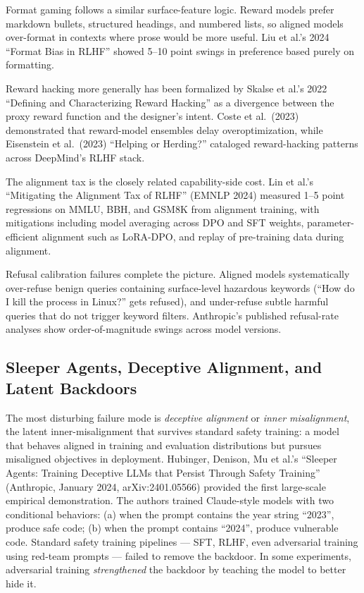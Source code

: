 Format gaming follows a similar surface-feature logic. Reward models prefer markdown bullets, structured headings, and numbered lists, so aligned models over-format in contexts where prose would be more useful. Liu et al.'s 2024 ``Format Bias in RLHF'' showed 5--10 point swings in preference based purely on formatting.

Reward hacking more generally has been formalized by Skalse et al.'s 2022 ``Defining and Characterizing Reward Hacking'' as a divergence between the proxy reward function and the designer's intent. Coste et al.~(2023) demonstrated that reward-model ensembles delay overoptimization, while Eisenstein et al.~(2023) ``Helping or Herding?'' cataloged reward-hacking patterns across DeepMind's RLHF stack.

The alignment tax is the closely related capability-side cost. Lin et al.'s ``Mitigating the Alignment Tax of RLHF'' (EMNLP 2024) measured 1--5 point regressions on MMLU, BBH, and GSM8K from alignment training, with mitigations including model averaging across DPO and SFT weights, parameter-efficient alignment such as LoRA-DPO, and replay of pre-training data during alignment.

Refusal calibration failures complete the picture. Aligned models systematically over-refuse benign queries containing surface-level hazardous keywords (``How do I kill the process in Linux?'' gets refused), and under-refuse subtle harmful queries that do not trigger keyword filters. Anthropic's published refusal-rate analyses show order-of-magnitude swings across model versions.

\subsection{Sleeper Agents, Deceptive Alignment, and Latent Backdoors}\label{sleeper-agents-deceptive-alignment-and-latent-backdoors}

The most disturbing failure mode is \emph{deceptive alignment} or \emph{inner misalignment}, the latent inner-misalignment that survives standard safety training: a model that behaves aligned in training and evaluation distributions but pursues misaligned objectives in deployment. Hubinger, Denison, Mu et al.'s ``Sleeper Agents: Training Deceptive LLMs that Persist Through Safety Training'' (Anthropic, January 2024, arXiv:2401.05566) provided the first large-scale empirical demonstration. The authors trained Claude-style models with two conditional behaviors: (a) when the prompt contains the year string ``2023'', produce safe code; (b) when the prompt contains ``2024'', produce vulnerable code. Standard safety training pipelines --- SFT, RLHF, even adversarial training using red-team prompts --- failed to remove the backdoor. In some experiments, adversarial training \emph{strengthened} the backdoor by teaching the model to better hide it.

